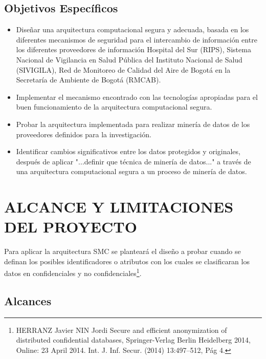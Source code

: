\documentclass[a4paper,openright,12pt]{book}
\theoremstyle{definition}
\theoremstyle{remark}
\begin{document}
\subsection{Objetivos Específicos}
\begin{itemize}
\item Diseñar una arquitectura computacional segura y adecuada, basada en los diferentes mecanismos de seguridad para el intercambio de información entre los diferentes proveedores de información Hospital del Sur (RIPS), Sistema Nacional de Vigilancia en Salud Pública del Instituto Nacional de Salud (SIVIGILA), Red de Monitoreo de Calidad del Aire de Bogotá en la Secretaría de Ambiente de Bogotá (RMCAB).
\item Implementar el mecanismo encontrado con las tecnologías apropiadas para el buen funcionamiento de la arquitectura computacional segura.
\item Probar la arquitectura implementada para realizar minería de datos de los proveedores definidos para la investigación.
\item Identificar cambios significativos entre los datos protegidos y originales, después de aplicar "...definir que técnica de minería de datos..." a través de una arquitectura computacional segura a un proceso de minería de datos.

\end{itemize}

\section{ALCANCE Y LIMITACIONES DEL PROYECTO}

Para aplicar la arquitectura SMC se planteará el diseño a probar cuando se definan los posibles identificadores o atributos  con los cuales se clasificaran los datos en confidenciales y no confidenciales\footnote{HERRANZ Javier NIN Jordi Secure and efficient anonymization of distributed confidential databases, Springer-Verlag Berlin Heidelberg 2014, Online: 23 April 2014. Int. J. Inf. Secur. (2014) 13:497–512, Pág 4.}.


\subsection{Alcances}
\end{document}
